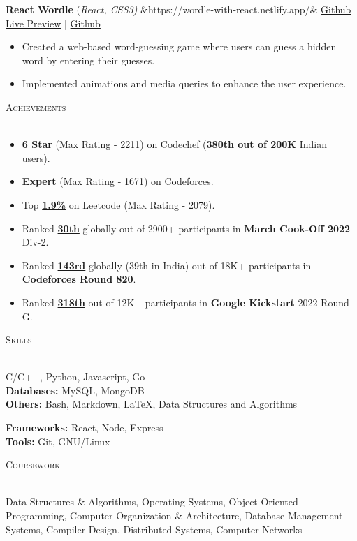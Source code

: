 \documentclass[a4paper]{article}
\newcommand{\sectionSep} { \vspace{3mm} }
\newcommand{\lineunder} {
    \vspace*{-8pt} \\
    \hspace*{-15pt} \hrulefill \\
}
\newcommand{\header} [1] {
    {\hspace*{-18pt}\vspace*{6pt} {
        \fontfamily{qcs}\selectfont \large \scshape #1
    }}
    \vspace*{-6pt} \lineunder
    \vspace{0.5mm}
}
\newcommand{\projectItem}[5]{
    {\textbf{#1}} {(\sl #2)}\hfill
    \ifx&#3&%
    \href{#4}{Github}\\
    \else
    \href{#3}{Live Preview} | \href{#4}{Github}\\
    \fi
    \begin{itemize}
        #5
    \end{itemize}
}
\begin{document}
\projectItem{React Wordle}{React, CSS3}{https://wordle-with-react.netlify.app/}{https://github.com/AkshatAggarwal14/react-wordle}{
    \item Created a web-based word-guessing game where users can guess a hidden word by entering their guesses.
    \item Implemented animations and media queries to enhance the user experience.
}
\sectionSep


\header{Achievements}
\begin{itemize}
    \item \textbf{\href{https://www.codechef.com/users/master_mind14}{6 Star}} (Max Rating - 2211) on Codechef (\textbf{380th out of 200K} Indian users).
    \item \textbf{\href{https://codeforces.com/profile/master._.mind}{Expert}} (Max Rating - 1671) on Codeforces.
    \item Top \textbf{\href{https://leetcode.com/AkshatAggarwal14/}{1.9\%}} on Leetcode (Max Rating - 2079).
    \item Ranked \textbf{\href{https://www.codechef.com/rankings/COOK139B?itemsPerPage=100&order=asc&page=1&search=master_mind14&sortBy=rank}{30th}} globally out of 2900+ participants in \textbf{March Cook-Off 2022} Div-2.
    \item Ranked \textbf{\href{https://codeforces.com/contest/1729/standings/participant/140098304\#p140098304}{143rd}} globally (39th in India) out of 18K+ participants in \textbf{Codeforces Round 820}.
    \item Ranked \textbf{\href{https://clist.by/standings/kick-start-round-g-31261744/?find_me=45689030}{318th}} out of 12K+ participants in \textbf{Google Kickstart} 2022 Round G.
\end{itemize}
\sectionSep


\header{Skills}
\begin{minipage}[t]{0.6\textwidth}
    C/C++, Python, Javascript, Go\\
    \textbf{Databases:} MySQL, MongoDB\\
    \textbf{Others:} Bash, Markdown, \LaTeX, Data Structures and Algorithms
\end{minipage}
\hfill
\begin{minipage}[t]{0.33\textwidth}
    \textbf{Frameworks:} React, Node, Express\\
    \textbf{Tools:} Git, GNU/Linux
\end{minipage}
\sectionSep

\header{Coursework}
Data Structures \& Algorithms,
Operating Systems,
Object Oriented Programming,
Computer Organization \& Architecture,
Database Management Systems,
Compiler Design,
Distributed Systems,
Computer Networks
\end{document}
